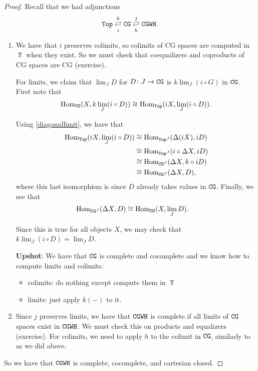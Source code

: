 \documentclass{article}[11pt]
\begin{document}
\begin{proof}

Recall that we had adjunctions
\begin{align*}
	\texttt{Top} \overset{k}{\underset{i}{\rightleftarrows}} \texttt{CG} \overset{j}{\underset{h}{\rightleftarrows}} \texttt{CGWH}.
\end{align*}

\begin{enumerate}
	\item We have that $i$ preserves colimits, so colimits of CG spaces are computed in $\Top$ when they exist. So we must check that coequalizers and coproducts of CG spaces are CG (exercise).

	For limits, we claim that $\displaystyle \lim_J D$ for $D\colon J\to \texttt{CG}$ is $\displaystyle k\lim_J (i\circ G)$ in $\texttt{CG}$.
First note that
	\begin{align*}
		\textup{Hom}_{\texttt{CG}} (X, k\lim_J (i\circ D)) \cong \textup{Hom}_{\texttt{Top}} (iX, \lim_J (i \circ D)).
	\end{align*}
	
	Using \autoref{diagonallimit}, we have that
	\begin{align*}
		\textup{Hom}_{\texttt{Top}} (iX, \lim_J( i \circ D)) &\cong \textup{Hom}_{\texttt{Top}^J} (\Delta(iX), iD) \\
		&\cong \textup{Hom}_{\texttt{Top}^J} (i\circ \Delta X, iD) \\
		&\cong \textup{Hom}_{\texttt{CG}^J} (\Delta X, k\circ iD) \\
		&\cong \textup{Hom}_{\texttt{CG}^J}(\Delta X, D),
	\end{align*}
	where this last isomorphism is since $D$ already takes values in $\texttt{CG}$. Finally, we see that
	\begin{align*}
		\textup{Hom}_{\texttt{CG}^J}(\Delta X, D) &\cong \textup{Hom}_{\texttt{CG}} (X, \lim_J D).
	\end{align*}

	Since this is true for all objects $X$, we may check that $k\lim_J (i\circ D) = \lim_J D$.


	\textbf{Upshot}: We have that $\texttt{CG}$ is complete and cocomplete and we know how to compute limits and colimits:
	\begin{itemize}
		\item colimits: do nothing except compute them in $\Top$
		\item limits: just apply $k(-)$ to it.
	\end{itemize}

	\item Since $j$ preserves limits, we have that $\texttt{CGWH}$ is complete if all limits of $\texttt{CG}$ spaces exist in $\texttt{CGWH}$. We must check this on products and equalizers (exercise). For colimits, we need to apply $h$ to the colimit in $\texttt{CG}$, similarly to as we did above.
\end{enumerate}

So we have that $\texttt{CGWH}$ is complete, cocomplete, and cartesian closed.
\end{proof}
\end{document}
